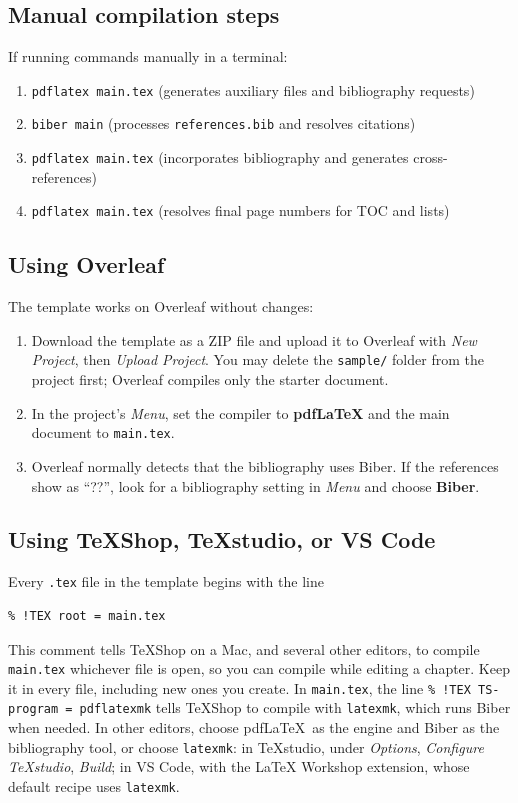 \subsection{Manual compilation steps}
If running commands manually in a terminal:
\begin{enumerate}
  \item \verb+pdflatex main.tex+ (generates auxiliary files and bibliography requests)
  \item \verb+biber main+ (processes \texttt{references.bib} and resolves citations)
  \item \verb+pdflatex main.tex+ (incorporates bibliography and generates cross-references)
  \item \verb+pdflatex main.tex+ (resolves final page numbers for TOC and lists)
\end{enumerate}

\subsection{Using Overleaf}
The template works on Overleaf without changes:
\begin{enumerate}
\item Download the template as a ZIP file and upload it to Overleaf with \emph{New Project}, then \emph{Upload Project}. You may delete the \texttt{sample/} folder from the project first; Overleaf compiles only the starter document.
\item In the project's \emph{Menu}, set the compiler to \textbf{pdfLaTeX} and the main document to \texttt{main.tex}.
\item Overleaf normally detects that the bibliography uses Biber. If the references show as ``??'', look for a bibliography setting in \emph{Menu} and choose \textbf{Biber}.
\end{enumerate}

\subsection{Using TeXShop, TeXstudio, or VS Code}
\label{subsec:editors}
Every \texttt{.tex} file in the template begins with the line
\begin{verbatim}
% !TEX root = main.tex
\end{verbatim}
This comment tells TeXShop on a Mac, and several other editors, to compile \texttt{main.tex} whichever file is open, so you can compile while editing a chapter. Keep it in every file, including new ones you create. In \texttt{main.tex}, the line \verb+% !TEX TS-program = pdflatexmk+ tells TeXShop to compile with \texttt{latexmk}, which runs Biber when needed. In other editors, choose pdf\LaTeX\ as the engine and Biber as the bibliography tool, or choose \texttt{latexmk}: in TeXstudio, under \emph{Options}, \emph{Configure TeXstudio}, \emph{Build}; in VS Code, with the LaTeX Workshop extension, whose default recipe uses \texttt{latexmk}.

